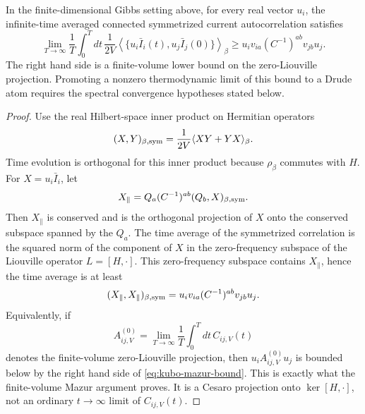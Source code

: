 \begin{lemma}
\label{lem:kubo-mazur-projection}
In the finite-dimensional Gibbs setting above, for every real vector \(u_i\),
the infinite-time averaged connected symmetrized current autocorrelation
satisfies
\begin{equation}
  \lim_{T\to\infty}\frac1T\int_0^T dt\,
  \frac1{2V}
  \left\langle
    \{u_i\bar I_i(t),u_j\bar I_j(0)\}
  \right\rangle_\beta
  \geq
  u_i v_{ia}(C^{-1})^{ab}v_{jb}u_j .
  \label{eq:kubo-mazur-bound}
\end{equation}
The right hand side is a finite-volume lower bound on the zero-Liouville
projection.  Promoting a nonzero thermodynamic limit of this bound to a
Drude atom requires the spectral convergence hypotheses stated below.
\end{lemma}

\begin{proof}
Use the real Hilbert-space inner product on Hermitian operators
\[
  (X,Y)_{\beta,{\rm sym}}
  =
  \frac1{2V}\langle XY+YX\rangle_\beta .
\]
Time evolution is orthogonal for this inner product because \(\rho_\beta\)
commutes with \(H\).  For \(X=u_i\bar I_i\), let
\[
  X_\parallel
  =
  Q_a(C^{-1})^{ab}(Q_b,X)_{\beta,{\rm sym}} .
\]
Then \(X_\parallel\) is conserved and is the orthogonal projection of \(X\)
onto the conserved subspace spanned by the \(Q_a\).  The time average of the
symmetrized correlation is the squared norm of the component of \(X\) in the
zero-frequency subspace of the Liouville operator \(L=[H,\cdot]\).  This
zero-frequency subspace contains \(X_\parallel\), hence the time average is
at least
\[
  (X_\parallel,X_\parallel)_{\beta,{\rm sym}}
  =
  u_i v_{ia}(C^{-1})^{ab}v_{jb}u_j .
\]
Equivalently, if
\begin{equation}
  A^{(0)}_{ij,V}
  =
  \lim_{T\to\infty}\frac1T\int_0^Tdt\,C_{ij,V}(t)
  \label{eq:kubo-finite-volume-zero-liouville-average}
\end{equation}
denotes the finite-volume zero-Liouville projection, then
\(u_iA^{(0)}_{ij,V}u_j\) is bounded below by the right hand side of
\eqref{eq:kubo-mazur-bound}.  This is exactly what the finite-volume Mazur
argument proves.  It is a Cesaro projection onto \(\ker[H,\cdot]\), not an
ordinary \(t\to\infty\) limit of \(C_{ij,V}(t)\).
\end{proof}

